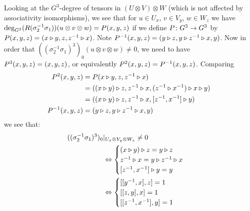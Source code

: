 \documentclass[a4paper, 10pt]{book}
\theoremstyle{definition}
\numberwithin{equation}{chapter}
\newcommand\hit{\triangleright}
\newcommand\inv{^{-1}}
\newcommand\ot{\otimes}
\begin{document}
Looking at the $G^3$-degree of tensors in $(U\ot V)\ot W$ (which is not affected by associativity isomorphisms), we see that for $u\in U_x$, $v\in V_y$, $w\in W_z$ we have
$\deg_{G^3}(R(\sigma_2\inv\sigma_1))(u\ot v\ot w)=\Pe(x,y,z)$ if we define $P\colon G^3\to G^3$ by $\Pe(x,y,z)=(x\hit y,z,z\inv\hit x)$. Note $\Pe\inv(x,y,z)=(y\hit z,y\hit z\inv\hit x,y)$. Now in order that $((\sigma_2\inv\sigma_1)^3)_0(u\ot v\ot w)\neq 0$, we need to have $P^3(x,y,z)=(x,y,z)$, or equivalently $\Pe^2(x,y,z)=\Pe\inv(x,y,z)$. Comparing
\begin{align*}
  \Pe^2(x,y,z)&=\Pe(x\hit y,z,z\inv\hit x)\\
            &=((x\hit y)\hit z,z\inv\hit x,(z\inv\hit x\inv)\hit x\hit y)\\
            &=((x\hit y)\hit z,z\inv\hit x,[z\inv,x\inv]\hit y)\\
  \Pe\inv(x,y,z)&=(y\hit z,y\hit z\inv\hit x,y)
\end{align*}
we see that:
\begin{align}
  ((\sigma_2\inv\sigma_1)^3)_0&|_{U_x\ot V_y\ot W_z}\neq 0\notag\\
                            & \Leftrightarrow
                              \begin{cases}(x\hit y)\hit z=y\hit z\\
                                z\inv\hit x=y\hit z\inv\hit x\\
                                [z\inv,x\inv]\hit y=y
                              \end{cases}\notag\\
                            &\Leftrightarrow\label{eq:condition0}
                              \begin{cases}[[y\inv,x],z]=1\\
                                [[z,y],x]=1\\
                                [[z\inv,x\inv],y]=1
                              \end{cases}
\end{align}
\end{document}
